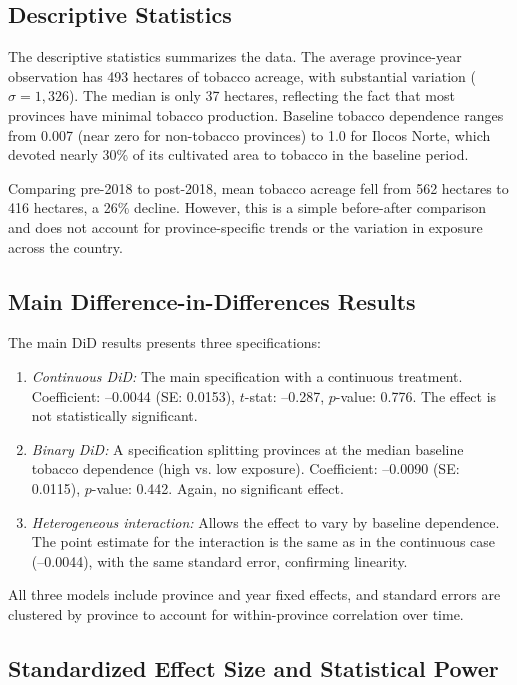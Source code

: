 \documentclass[12pt]{article}
\begin{document}
\subsection{Descriptive Statistics}

The descriptive statistics summarizes the data. The average province-year observation has 493 hectares of tobacco acreage, with substantial variation ($\sigma = 1,326$). The median is only 37 hectares, reflecting the fact that most provinces have minimal tobacco production. Baseline tobacco dependence ranges from 0.007 (near zero for non-tobacco provinces) to 1.0 for Ilocos Norte, which devoted nearly 30\% of its cultivated area to tobacco in the baseline period.

Comparing pre-2018 to post-2018, mean tobacco acreage fell from 562 hectares to 416 hectares, a 26\% decline. However, this is a simple before-after comparison and does not account for province-specific trends or the variation in exposure across the country.

\subsection{Main Difference-in-Differences Results}

The main DiD results presents three specifications:

\begin{enumerate}
\item \emph{Continuous DiD:} The main specification with a continuous treatment. Coefficient: --0.0044 (SE: 0.0153), $t$-stat: --0.287, $p$-value: 0.776. The effect is not statistically significant.

\item \emph{Binary DiD:} A specification splitting provinces at the median baseline tobacco dependence (high vs. low exposure). Coefficient: --0.0090 (SE: 0.0115), $p$-value: 0.442. Again, no significant effect.

\item \emph{Heterogeneous interaction:} Allows the effect to vary by baseline dependence. The point estimate for the interaction is the same as in the continuous case (--0.0044), with the same standard error, confirming linearity.
\end{enumerate}

All three models include province and year fixed effects, and standard errors are clustered by province to account for within-province correlation over time.

\subsection{Standardized Effect Size and Statistical Power}
\end{document}
